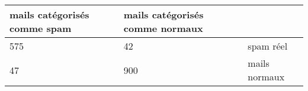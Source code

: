 \begin{tabular}{l|l|l}
mails catégorisés comme spam  & mails catégorisés comme normaux & ~ \\
\hline
 575& 42 &   spam réel \\
\hline
  47& 900 &   mails normaux \\
\end{tabular}
